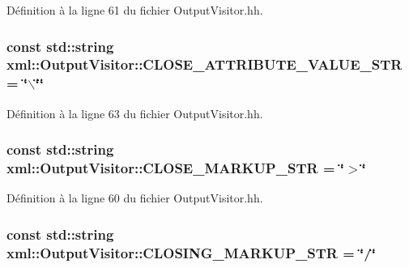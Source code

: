Définition à la ligne 61 du fichier OutputVisitor.hh.

\hypertarget{classxml_1_1_output_visitor_af3b7b1a653908df91dc19195b3bdb29b}{
\subsubsection[{CLOSE\_\-ATTRIBUTE\_\-VALUE\_\-STR}]{\setlength{\rightskip}{0pt plus 5cm}const std::string {\bf xml::OutputVisitor::CLOSE\_\-ATTRIBUTE\_\-VALUE\_\-STR} = \char`\"{}$\backslash$\char`\"{}\char`\"{}}}
\label{classxml_1_1_output_visitor_af3b7b1a653908df91dc19195b3bdb29b}


Définition à la ligne 63 du fichier OutputVisitor.hh.

\hypertarget{classxml_1_1_output_visitor_aef349142e7de8a309ee5dd048cc5b51f}{
\subsubsection[{CLOSE\_\-MARKUP\_\-STR}]{\setlength{\rightskip}{0pt plus 5cm}const std::string {\bf xml::OutputVisitor::CLOSE\_\-MARKUP\_\-STR} = \char`\"{}$>$\char`\"{}}}
\label{classxml_1_1_output_visitor_aef349142e7de8a309ee5dd048cc5b51f}


Définition à la ligne 60 du fichier OutputVisitor.hh.

\hypertarget{classxml_1_1_output_visitor_af06f2eb91d0a40d0d090aeb0bdeb9c9f}{
\subsubsection[{CLOSING\_\-MARKUP\_\-STR}]{\setlength{\rightskip}{0pt plus 5cm}const std::string {\bf xml::OutputVisitor::CLOSING\_\-MARKUP\_\-STR} = \char`\"{}/\char`\"{}}}
\label{classxml_1_1_output_visitor_af06f2eb91d0a40d0d090aeb0bdeb9c9f}


